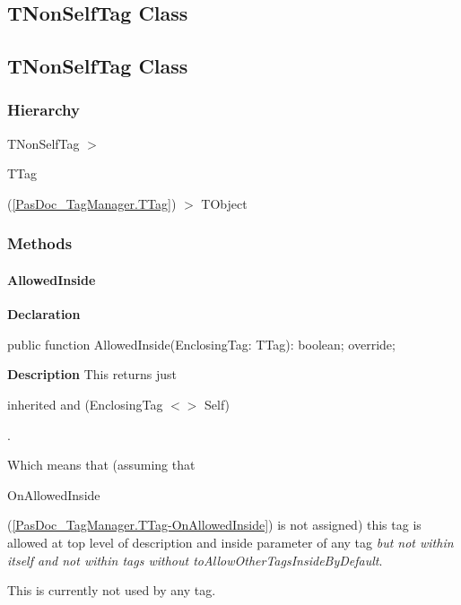 \documentclass{report}
\newif\ifpdf
\begin{document}
\subsection*{\large{\textbf{TNonSelfTag Class}}\normalsize\hspace{1ex}\hrulefill}
\else
\subsection*{TNonSelfTag Class}
\fi
\label{PasDoc_TagManager.TNonSelfTag}
\subsubsection*{\large{\textbf{Hierarchy}}\normalsize\hspace{1ex}\hfill}
TNonSelfTag {$>$} \begin{ttfamily}TTag\end{ttfamily}(\ref{PasDoc_TagManager.TTag}) {$>$} 
TObject
\subsubsection*{\large{\textbf{Methods}}\normalsize\hspace{1ex}\hfill}
\paragraph*{AllowedInside}\hspace*{\fill}

\label{PasDoc_TagManager.TNonSelfTag-AllowedInside}
\begin{list}{}{
\setlength{\itemindent}{0cm}
\setlength{\listparindent}{0cm}
\setlength{\leftmargin}{\evensidemargin}
\addtolength{\leftmargin}{\tmplength}
\settowidth{\labelsep}{X}
\addtolength{\leftmargin}{\labelsep}
\setlength{\labelwidth}{\tmplength}
}
\item[\textbf{Declaration}\hfill]
\ifpdf
\begin{flushleft}
\fi
\begin{ttfamily}
public function AllowedInside(EnclosingTag: TTag): boolean; override;\end{ttfamily}

\ifpdf
\end{flushleft}
\fi

\par
\item[\textbf{Description}]
This returns just \begin{ttfamily}inherited and (EnclosingTag {$<$}{$>$} Self)\end{ttfamily}.

Which means that (assuming that \begin{ttfamily}OnAllowedInside\end{ttfamily}(\ref{PasDoc_TagManager.TTag-OnAllowedInside}) is not assigned) this tag is allowed at top level of description and inside parameter of any tag \textit{but not within itself and not within tags without toAllowOtherTagsInsideByDefault}.

This is currently not used by any tag.

\end{list}
\ifpdf
\end{document}
